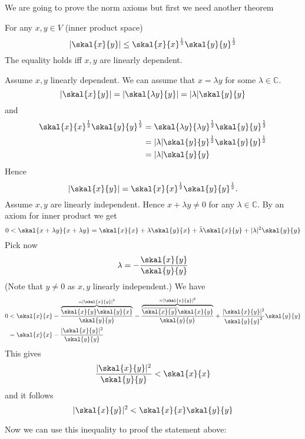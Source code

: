 We are going to prove the norm axioms but first we need another theorem
	\begin{theorem}
		For any $x,y \in V$ (inner product space) 
		\[
			\abs{\skal{x}{y}} \leq \skal{x}{x}^{\frac{1}{2}} \skal{y}{y}^{\frac{1}{2}}
		\]
		The equality holds iff $x,y$ are linearly dependent.
	\end{theorem}
	\begin{beweis}
		Assume $x,y$ linearly dependent. We can assume that $x= \lambda y$ for some $\lambda \in \mathbb{C} $.
		\[
			\abs{\skal{x}{y}} = \abs{ \skal{\lambda y}{y}} = \abs{\lambda} \skal{y}{y}
		\]
		and
		\begin{align*}
					\skal{x}{x}^{\frac{1}{2}} \skal{y}{y}^{\frac{1}{2}} &= \skal{\lambda y}{\lambda y}^{\frac{1}{2}} \skal{y}{y}^{\frac{1}{2}} \\
					&= \abs{\lambda} \skal{y}{y}^{\frac{1}{2}} \skal{y}{y}^{\frac{1}{2}} \\
					&= \abs{\lambda} \skal{y}{y}
		\end{align*}
		Hence \[
			\abs{\skal{x}{y}} = \skal{x}{x}^{\frac{1}{2}} \skal{y}{y}^{\frac{1}{2}}.
		\]
		Assume $x,y$ are linearly independent. Hence $x + \lambda y \neq 0$ for any $\lambda \in \mathbb{C}$. By an axiom for inner product we get
		\[
			0< \skal{x+ \lambda y}{x + \lambda y} = \skal{x}{x} + \lambda \skal{y}{x} + \bar{\lambda} \skal{x}{y} + \abs{\lambda}^2 \skal{y}{y}
		\]
		Pick now
		\[
			\lambda = - \frac{\skal{x}{y}}{\skal{y}{y}}
		\]
		(Note that $y \neq 0$ as $x,y$ linearly independent.)
		We have \begin{align*}
						0 &< \skal{x}{x} - \frac{\overset{= \abs{\skal{x}{y}}^2}{\overbrace{\skal{x}{y}\skal{y}{x}}}}{\skal{y}{y}} - \frac{\overset{= \abs{\skal{x}{y}}^2}{\overbrace{\overline{\skal{x}{y}}\skal{x}{y}}}}{\skal{y}{y}}+ \frac{\abs{\skal{x}{y}}^2}{\skal{y}{y}^2} \skal{y}{y} \\
						&= \skal{x}{x} - \frac{\abs{\skal{x}{y}}^2}{\skal{y}{y}}
		\end{align*}
		This gives
		\[
			\frac{\abs{\skal{x}{y}}^2}{\skal{y}{y}} < \skal{x}{x}
		\]
		and it follows
		\[
			\abs{\skal{x}{y}}^2 < \skal{x}{x} \skal{y}{y}
		\]
	\end{beweis}
Now we can use this inequality to proof the statement above:
